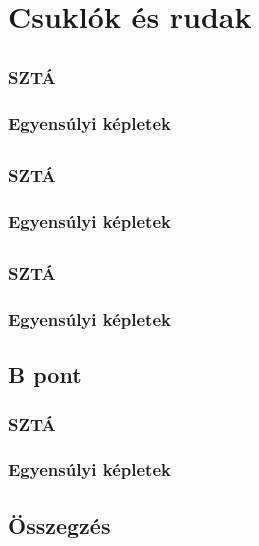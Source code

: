 \section{Csuklók és rudak}

\subsection{}
\subsubsection{SZTÁ}
\subsubsection{Egyensúlyi képletek}

\newpage

\subsection{}
\subsubsection{SZTÁ}
\subsubsection{Egyensúlyi képletek}

\newpage

\subsection{}
\subsubsection{SZTÁ}
\subsubsection{Egyensúlyi képletek}

\newpage

\subsection{B pont}
\subsubsection{SZTÁ}
\subsubsection{Egyensúlyi képletek}

\newpage

\subsection{Összegzés}
